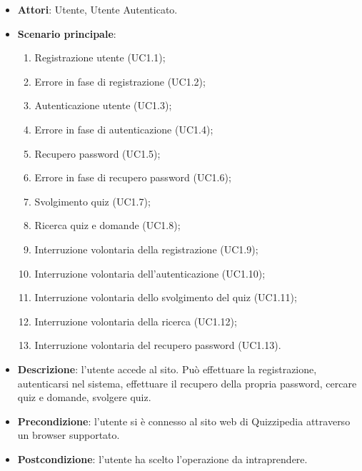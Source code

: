 \begin{itemize}
\item \textbf{Attori}: Utente, Utente Autenticato.
\item \textbf{Scenario principale}:
\begin{enumerate}
\item Registrazione utente (UC1.1);
\item Errore in fase di registrazione (UC1.2);
\item Autenticazione utente (UC1.3);
\item Errore in fase di autenticazione (UC1.4);
\item Recupero password (UC1.5);
\item Errore in fase di recupero password (UC1.6);
\item Svolgimento quiz (UC1.7);
\item Ricerca quiz e domande (UC1.8);
\item Interruzione volontaria della registrazione (UC1.9);
\item Interruzione volontaria dell'autenticazione (UC1.10);
\item Interruzione volontaria dello svolgimento del quiz (UC1.11);
\item Interruzione volontaria della ricerca (UC1.12);
\item Interruzione volontaria del recupero password (UC1.13).
\end{enumerate}
\item \textbf{Descrizione}: l'utente accede al sito. Può effettuare la registrazione, autenticarsi nel sistema, effettuare il recupero della propria password, cercare quiz e domande, svolgere quiz.
\item \textbf{Precondizione}: l'utente si è connesso al sito web di Quizzipedia attraverso un browser supportato.
\item \textbf{Postcondizione}: l'utente ha scelto l'operazione da intraprendere.
\end{itemize}
